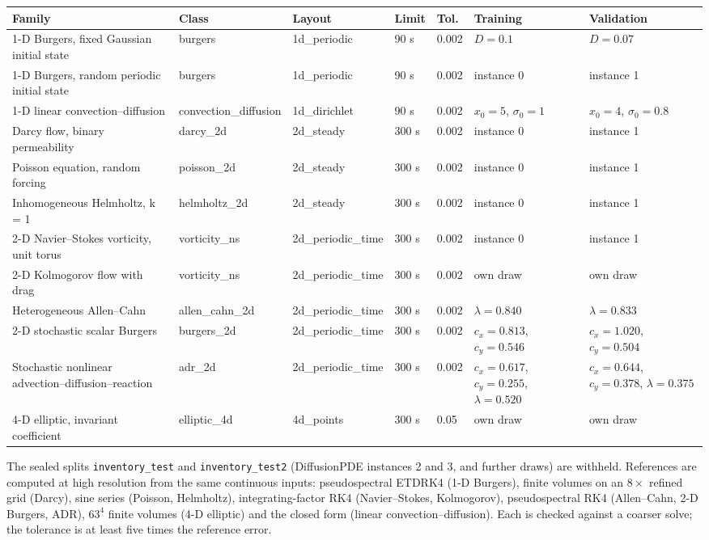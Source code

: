 \documentclass[11pt]{article}
\begin{document}
\begin{center}
\footnotesize\setlength{\tabcolsep}{3pt}
\begin{tabular}{p{2.4cm}p{2.9cm}p{2.45cm}p{0.8cm}p{0.9cm}p{2.4cm}p{2.4cm}}
\toprule
Family & Class & Layout & Limit & Tol. & Training & Validation \\
\midrule
1-D Burgers, fixed Gaussian initial state & burgers & 1d\_periodic & 90 s & 0.002 & $D=0.1$ & $D=0.07$ \\
1-D Burgers, random periodic initial state & burgers & 1d\_periodic & 90 s & 0.002 & instance 0 & instance 1 \\
1-D linear convection--diffusion & convection\_diffusion & 1d\_dirichlet & 90 s & 0.002 & $x_0=5$, $\sigma_0=1$ & $x_0=4$, $\sigma_0=0.8$ \\
Darcy flow, binary permeability & darcy\_2d & 2d\_steady & 300 s & 0.002 & instance 0 & instance 1 \\
Poisson equation, random forcing & poisson\_2d & 2d\_steady & 300 s & 0.002 & instance 0 & instance 1 \\
Inhomogeneous Helmholtz, k = 1 & helmholtz\_2d & 2d\_steady & 300 s & 0.002 & instance 0 & instance 1 \\
2-D Navier--Stokes vorticity, unit torus & vorticity\_ns & 2d\_periodic\_time & 300 s & 0.002 & instance 0 & instance 1 \\
2-D Kolmogorov flow with drag & vorticity\_ns & 2d\_periodic\_time & 300 s & 0.002 & own draw & own draw \\
Heterogeneous Allen--Cahn & allen\_cahn\_2d & 2d\_periodic\_time & 300 s & 0.002 & $\lambda=0.840$ & $\lambda=0.833$ \\
2-D stochastic scalar Burgers & burgers\_2d & 2d\_periodic\_time & 300 s & 0.002 & $c_x=0.813$, $c_y=0.546$ & $c_x=1.020$, $c_y=0.504$ \\
Stochastic nonlinear advection--diffusion--reaction & adr\_2d & 2d\_periodic\_time & 300 s & 0.002 & $c_x=0.617$, $c_y=0.255$, $\lambda=0.520$ & $c_x=0.644$, $c_y=0.378$, $\lambda=0.375$ \\
4-D elliptic, invariant coefficient & elliptic\_4d & 4d\_points & 300 s & 0.05 & own draw & own draw \\
\bottomrule
\end{tabular}
\end{center}
\noindent The sealed splits \texttt{inventory\_test} and \texttt{inventory\_test2} (DiffusionPDE
instances 2 and 3, and further draws) are withheld. References are computed at high resolution from the same
continuous inputs: pseudospectral ETDRK4 (1-D Burgers), finite volumes on an $8\times$ refined grid (Darcy), sine
series (Poisson, Helmholtz), integrating-factor RK4 (Navier--Stokes, Kolmogorov), pseudospectral RK4 (Allen--Cahn,
2-D Burgers, ADR), $63^4$ finite volumes (4-D elliptic) and the closed form (linear convection--diffusion). Each is
checked against a coarser solve; the tolerance is at least five times the reference error.
\end{document}

